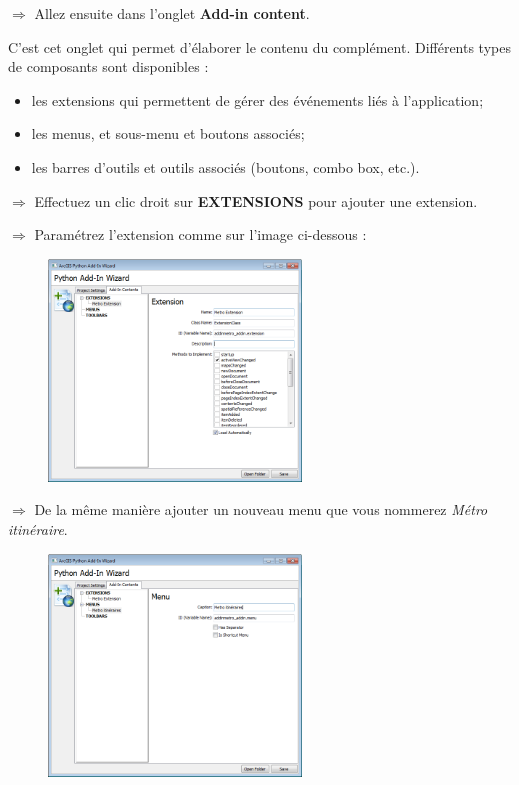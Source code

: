 \documentclass[11pt]{article}
\newcommand{\action}{$\Rightarrow$ }
\begin{document}
\action Allez ensuite dans l'onglet \textbf{Add-in content}.

C'est cet onglet qui permet d'élaborer le contenu du complément.
Différents types de composants sont disponibles :
\begin{itemize}
	\item les extensions qui permettent de gérer des événements liés à l'application;
	\item les menus, et sous-menu et boutons associés;
	\item les barres d'outils et outils associés (boutons, combo box, etc.).
\end{itemize}

\action Effectuez un clic droit sur \textbf{EXTENSIONS} pour ajouter une extension.

\action Paramétrez l'extension comme sur l'image ci-dessous :
\begin{figure}[H]
	\center \includegraphics[width=0.6\textwidth]{img/td3/addin_assistant-2.png} \\
\end{figure}

\action De la même manière ajouter un nouveau menu que vous nommerez \textit{Métro itinéraire}.
\begin{figure}[H]
	\center \includegraphics[width=0.6\textwidth]{img/td3/addin_assistant-3.png} \\
\end{figure}
\end{document}
